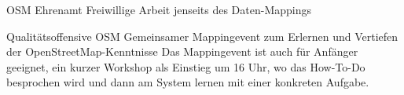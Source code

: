 %
{OSM Ehrenamt}%
{Freiwillige Arbeit jenseits des Daten-Mappings}%
{}

%
{Qualitätsoffensive OSM}%
{Gemeinsamer Mappingevent zum Erlernen und Vertiefen der OpenStreetMap-Kenntnisse}%
{Das Mappingevent ist auch für Anfänger geeignet, ein kurzer Workshop als Einstieg um 16 Uhr, wo das How-To-Do besprochen wird und dann am System lernen mit einer konkreten Aufgabe.}
